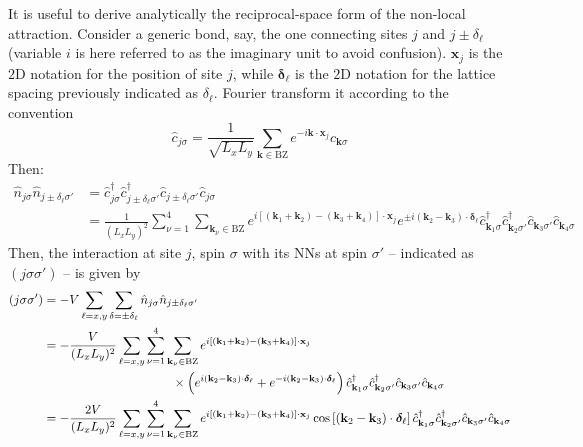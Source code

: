 It is useful to derive analytically the reciprocal-space form of the non-local attraction. Consider a generic bond, say, the one connecting sites $j$ and $j\pm\delta_\ell$ (variable $i$ is here referred to as the imaginary unit to avoid confusion). $\mathbf{x}_j$ is the $2$D notation for the position of site $j$, while $\bm{\delta}_\ell$ is the $2$D notation for the lattice spacing previously indicated as $\delta_\ell$. Fourier transform it according to the convention
\[
\hat c_{j\sigma} = \frac{1}{\sqrt{L_xL_y}} \sum_{\mathbf{k} \in \mathrm{BZ}} e^{-i \mathbf{k} \cdot \mathbf{x}_j} \hat c_{\mathbf{k}\sigma}
\]
Then:
\[
\begin{aligned}
	\hat n_{j\sigma} \hat n_{j \pm \delta_\ell \sigma'} &= \hat c_{j\sigma}^\dagger \hat c_{j \pm \delta_\ell \sigma'}^\dagger \hat c_{j \pm \delta_\ell \sigma'} \hat c_{j\sigma} \\
	&= \frac{1}{(L_xL_y)^2} \sum_{\nu=1}^4 \sum_{\mathbf{k}_\nu \in \mathrm{BZ}} e^{i \left[ (\mathbf{k}_1 + \mathbf{k}_2) - (\mathbf{k}_3 + \mathbf{k}_4) \right] \cdot \mathbf{x}_j} e^{\pm i(\mathbf{k}_2-\mathbf{k}_3) \cdot \bm{\delta}_\ell}  \hat c_{\mathbf{k}_1 \sigma}^\dagger \hat c_{\mathbf{k}_2 \sigma'}^\dagger \hat c_{\mathbf{k}_3 \sigma'} \hat c_{\mathbf{k}_4\sigma}
\end{aligned}
\]
Then, the interaction at site $j$, spin $\sigma$ with its NNs at spin $\sigma'$ -- indicated as $(j\sigma\sigma')$ -- is given by
\[
\begin{aligned}
	(j\sigma\sigma') &= -V \sum_{\ell = x,y} \sum_{\delta = \pm \delta_\ell} \hat n_{j\sigma} \hat n_{j \pm \delta_\ell \sigma'} \\
	&= -\frac{V}{(L_xL_y)^2} \sum_{\ell = x,y} \sum_{\nu=1}^4 \sum_{\mathbf{k}_\nu \in \mathrm{BZ}} e^{i \left[ (\mathbf{k}_1 + \mathbf{k}_2) - (\mathbf{k}_3 + \mathbf{k}_4) \right] \cdot \mathbf{x}_j} \\
	&\hspace{0.3\textwidth} \times \left(
	e^{ i(\mathbf{k}_2-\mathbf{k}_3) \cdot \bm{\delta}_\ell} + e^{ -i(\mathbf{k}_2-\mathbf{k}_3) \cdot \bm{\delta}_\ell} 
	\right)
	\hat c_{\mathbf{k}_1 \sigma}^\dagger \hat c_{\mathbf{k}_2 \sigma'}^\dagger \hat c_{\mathbf{k}_3 \sigma'} \hat c_{\mathbf{k}_4\sigma} \\
	&= -\frac{2V}{(L_xL_y)^2} \sum_{\ell = x,y} \sum_{\nu=1}^4 \sum_{\mathbf{k}_\nu \in \mathrm{BZ}} e^{i \left[ (\mathbf{k}_1 + \mathbf{k}_2) - (\mathbf{k}_3 + \mathbf{k}_4) \right] \cdot \mathbf{x}_j} \cos\left[
	(\mathbf{k}_2-\mathbf{k}_3) \cdot \bm{\delta}_\ell
	\right]	\hat c_{\mathbf{k}_1 \sigma}^\dagger \hat c_{\mathbf{k}_2 \sigma'}^\dagger \hat c_{\mathbf{k}_3 \sigma'} \hat c_{\mathbf{k}_4\sigma}
\end{aligned}
\]
